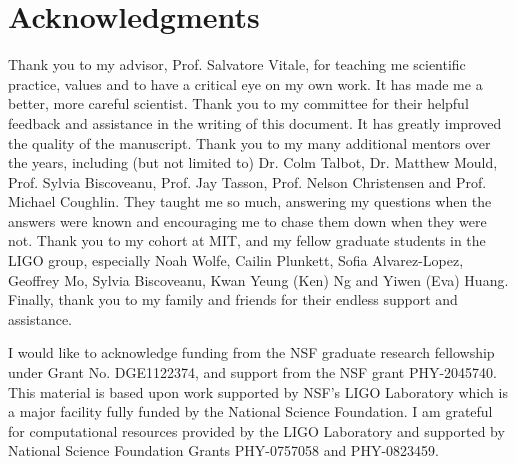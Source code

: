 

\chapter*{Acknowledgments}


Thank you to my advisor, Prof. Salvatore Vitale, for teaching me scientific practice, values and to have a critical eye on my own work. It has made me a better, more careful scientist. 
Thank you to my committee for their helpful feedback and assistance in the writing of this document. It has greatly improved the quality of the manuscript.
Thank you to my many additional mentors over the years, including (but not limited to) Dr. Colm Talbot, Dr. Matthew Mould, Prof. Sylvia Biscoveanu, Prof. Jay Tasson, Prof. Nelson Christensen and Prof. Michael Coughlin. They taught me so much, answering my questions when the answers were known and encouraging me to chase them down when they were not.
Thank you to my cohort at MIT, and my fellow graduate students in the LIGO group, especially Noah Wolfe, Cailin Plunkett, Sofia Alvarez-Lopez, Geoffrey Mo, Sylvia Biscoveanu, Kwan Yeung (Ken) Ng and Yiwen (Eva) Huang. 
Finally, thank you to my family and friends for their endless support and assistance.

I would like to acknowledge funding from the NSF graduate research fellowship under Grant No. DGE1122374, and support from the NSF grant PHY-2045740.  
This material is based upon work supported by NSF’s LIGO Laboratory which is a major facility fully funded by the National Science Foundation. 
I am grateful for computational resources provided by the LIGO Laboratory and supported by National Science Foundation Grants PHY-0757058 and PHY-0823459.
